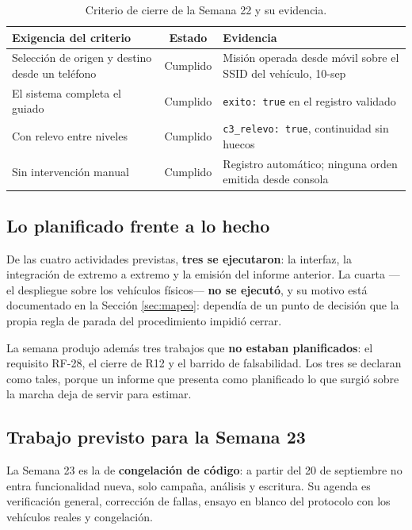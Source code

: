 \documentclass[12pt,letterpaper]{article}
\begin{document}
\begin{table}[H]
    \centering
    \small
    \caption{Criterio de cierre de la Semana 22 y su evidencia.}
    \label{tab:cierre}
    \begin{tabular}{@{}p{5.6cm}cp{6.0cm}@{}}
        \toprule
        \textbf{Exigencia del criterio} & \textbf{Estado} & \textbf{Evidencia} \\ \midrule
        Selección de origen y destino desde un teléfono & Cumplido & Misión operada desde móvil sobre el SSID del vehículo, 10-sep \\ \addlinespace
        El sistema completa el guiado & Cumplido & \texttt{exito: true} en el registro validado \\ \addlinespace
        Con relevo entre niveles & Cumplido & \texttt{c3\_relevo: true}, continuidad sin huecos \\ \addlinespace
        Sin intervención manual & Cumplido & Registro automático; ninguna orden emitida desde consola \\ \bottomrule
    \end{tabular}
\end{table}

\subsection{Lo planificado frente a lo hecho}

De las cuatro actividades previstas, \textbf{tres se ejecutaron}: la interfaz, la integración de extremo a extremo y la emisión del informe anterior. La cuarta ---el despliegue sobre los vehículos físicos--- \textbf{no se ejecutó}, y su motivo está documentado en la Sección \ref{sec:mapeo}: dependía de un punto de decisión que la propia regla de parada del procedimiento impidió cerrar.

La semana produjo además tres trabajos que \textbf{no estaban planificados}: el requisito RF-28, el cierre de R12 y el barrido de falsabilidad. Los tres se declaran como tales, porque un informe que presenta como planificado lo que surgió sobre la marcha deja de servir para estimar.

\subsection{Trabajo previsto para la Semana 23}

La Semana 23 es la de \textbf{congelación de código}: a partir del 20 de septiembre no entra funcionalidad nueva, solo campaña, análisis y escritura. Su agenda es verificación general, corrección de fallas, ensayo en blanco del protocolo con los vehículos reales y congelación.
\end{document}
